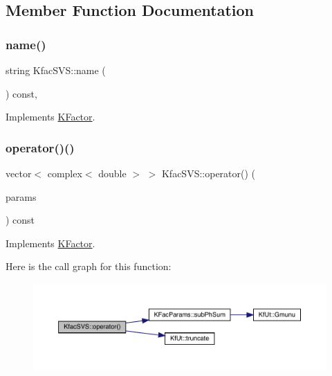 \subsection{Member Function Documentation}
\mbox{\label{classKfacSVS_af7a1fd20af79d6a2f844cf4418a5eeb8}} 
\subsubsection{\texorpdfstring{name()}{name()}}
{\footnotesize\ttfamily string Kfac\+S\+V\+S\+::name (\begin{DoxyParamCaption}{ }\end{DoxyParamCaption}) const\hspace{0.3cm}{\ttfamily [inline]}, {\ttfamily [virtual]}}



Implements \mbox{\hyperlink{classKFactor_ae578f8d6e4b525895427717da99cab6c}{K\+Factor}}.

\mbox{\label{classKfacSVS_a1bcfae29380c602c7040ad790ccff63f}} 
\subsubsection{\texorpdfstring{operator()()}{operator()()}}
{\footnotesize\ttfamily vector$<$ complex$<$ double $>$ $>$ Kfac\+S\+V\+S\+::operator() (\begin{DoxyParamCaption}\item[{const \mbox{\hyperlink{classKFacParams}{K\+Fac\+Params}} \&}]{params }\end{DoxyParamCaption}) const\hspace{0.3cm}{\ttfamily [virtual]}}



Implements \mbox{\hyperlink{classKFactor_a012aae9ff4a07eab86d5d50b7f774285}{K\+Factor}}.

Here is the call graph for this function\+:\nopagebreak
\begin{figure}[H]
\begin{center}
\leavevmode
\includegraphics[width=350pt]{d0/dde/classKfacSVS_a1bcfae29380c602c7040ad790ccff63f_cgraph}
\end{center}
\end{figure}



